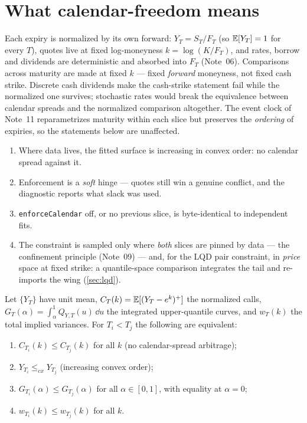 \documentclass[11pt]{article}
\begin{document}
\tableofcontents
\newpage

\section{What calendar-freedom means}
\label{sec:meaning}

\begin{assumption}
\label{ass:units}
Each expiry is normalized by its own forward: $Y_T=S_T/F_T$ (so
$\mathbb{E}[Y_T]=1$ for every $T$), quotes live at fixed log-moneyness
$k=\log(K/F_T)$, and rates, borrow and dividends are deterministic and
absorbed into $F_T$ (Note~06). Comparisons across maturity are made at fixed
$k$ --- fixed \emph{forward} moneyness, not fixed cash strike. Discrete cash
dividends make the cash-strike statement fail while the normalized one
survives; stochastic rates would break the equivalence between calendar
spreads and the normalized comparison altogether. The event clock of
Note~11 reparametrizes maturity within each slice but preserves the
\emph{ordering} of expiries, so the statements below are unaffected.
\end{assumption}

\begin{invariant}
\begin{enumerate}[leftmargin=1.6em]
\item Where data lives, the fitted surface is increasing in convex order:
no calendar spread against it.
\item Enforcement is a \emph{soft} hinge --- quotes still win a genuine
conflict, and the diagnostic reports what slack was used.
\item \texttt{enforceCalendar} off, or no previous slice, is byte-identical
to independent fits.
\item The constraint is sampled only where \emph{both} slices are pinned by
data --- the confinement principle (Note~09) --- and, for the LQD pair
constraint, in \emph{price} space at fixed strike: a quantile-space
comparison integrates the tail and re-imports the wing
(\cref{sec:lqd}).
\end{enumerate}
\end{invariant}

\begin{theorem}
\label{thm:faces}
Let $\{Y_T\}$ have unit mean, $C_T(k)=\mathbb{E}[(Y_T-e^k)^+]$ the normalized calls,
$G_T(\alpha)=\int_\alpha^1Q_{Y,T}(u)\,\dd u$ the integrated upper-quantile
curves, and $w_T(k)$ the total implied variances. For $T_i<T_j$ the
following are equivalent:
\begin{enumerate}[leftmargin=1.8em,label=(\roman*)]
\item $C_{T_i}(k)\le C_{T_j}(k)$ for all $k$ (no calendar-spread arbitrage);
\item $Y_{T_i}\le_{cx}Y_{T_j}$ (increasing convex order);
\item $G_{T_i}(\alpha)\le G_{T_j}(\alpha)$ for all $\alpha\in[0,1]$, with
equality at $\alpha=0$;
\item $w_{T_i}(k)\le w_{T_j}(k)$ for all $k$.
\end{enumerate}
\end{theorem}
\end{document}
